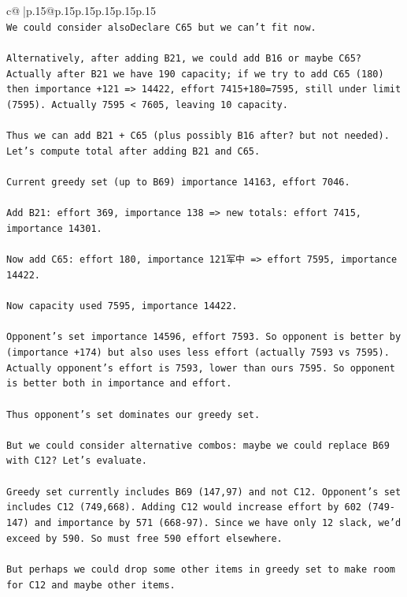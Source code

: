 \documentclass{article}
\begin{document}
{\begin{supertabular}{c@{$\;$}|p{.15\linewidth}@{}p{.15\linewidth}p{.15\linewidth}p{.15\linewidth}p{.15\linewidth}p{.15\linewidth}}
{{{\\ 
\texttt{We could consider alsoDeclare C65 but we can't fit now.} \\
\\ 
\texttt{Alternatively, after adding B21, we could add B16 or maybe C65? Actually after B21 we have 190 capacity; if we try to add C65 (180) then importance +121 => 14422, effort 7415+180=7595, still under limit (7595). Actually 7595 < 7605, leaving 10 capacity.} \\
\\ 
\texttt{Thus we can add B21 + C65 (plus possibly B16 after? but not needed). Let's compute total after adding B21 and C65.} \\
\\ 
\texttt{Current greedy set (up to B69) importance 14163, effort 7046.} \\
\\ 
\texttt{Add B21: effort 369, importance 138 => new totals: effort 7415, importance 14301.} \\
\\ 
\texttt{Now add C65: effort 180, importance 121军中 => effort 7595, importance 14422.} \\
\\ 
\texttt{Now capacity used 7595, importance 14422.} \\
\\ 
\texttt{Opponent's set importance 14596, effort 7593. So opponent is better by (importance +174) but also uses less effort (actually 7593 vs 7595). Actually opponent's effort is 7593, lower than ours 7595. So opponent is better both in importance and effort.} \\
\\ 
\texttt{Thus opponent's set dominates our greedy set.} \\
\\ 
\texttt{But we could consider alternative combos: maybe we could replace B69 with C12? Let's evaluate.} \\
\\ 
\texttt{Greedy set currently includes B69 (147,97) and not C12. Opponent's set includes C12 (749,668). Adding C12 would increase effort by 602 (749{-}147) and importance by 571 (668{-}97). Since we have only 12 slack, we'd exceed by 590. So must free 590 effort elsewhere.} \\
\\ 
\texttt{But perhaps we could drop some other items in greedy set to make room for C12 and maybe other items.} \\
\\ 
}}}
\end{supertabular}}
\end{document}

